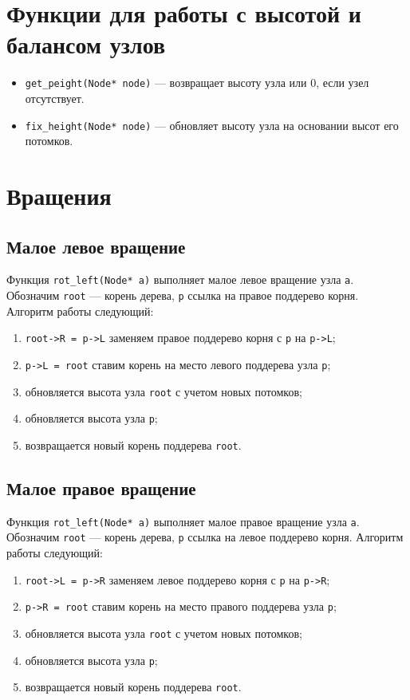 \section{Функции для работы с высотой и балансом узлов}
\begin{itemize}
	\item \texttt{get\_рeight(Node* node)} --- возвращает высоту узла или 0, если узел отсутствует.
	\item \texttt{fix\_height(Node* node)} --- обновляет высоту узла на основании высот его потомков.
\end{itemize}

\section{Вращения}
\subsection*{Малое левое вращение}
Функция \texttt{rot\_left(Node* a)} выполняет малое левое вращение узла \texttt{a}. Обозначим \texttt{root} --- корень дерева, \texttt{p} ссылка на правое поддерево корня. Алгоритм работы следующий:
\begin{enumerate}
	\item \texttt{root->R = p->L} заменяем правое поддерево корня с \texttt{p} на \texttt{p->L};
	\item \texttt{p->L = root} ставим корень на место левого поддерева узла \texttt{p};
	\item обновляется высота узла \texttt{root} с учетом новых потомков;
	\item обновляется высота узла \texttt{p};
	\item возвращается новый корень поддерева \texttt{root}.
\end{enumerate}

\subsection*{Малое правое вращение}
Функция \texttt{rot\_left(Node* a)} выполняет малое правое вращение узла \texttt{a}. Обозначим \texttt{root} --- корень дерева, \texttt{p} ссылка на левое поддерево корня. Алгоритм работы следующий:
\begin{enumerate}
	\item \texttt{root->L = p->R} заменяем левое поддерево корня с \texttt{p} на \texttt{p->R};
	\item \texttt{p->R = root} ставим корень на место правого поддерева узла \texttt{p};
	\item обновляется высота узла \texttt{root} с учетом новых потомков;
	\item обновляется высота узла \texttt{p};
	\item возвращается новый корень поддерева \texttt{root}.
\end{enumerate}

